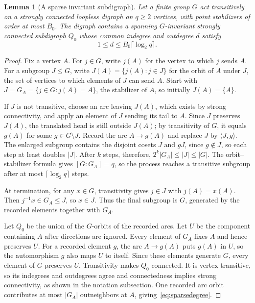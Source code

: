 \documentclass[11pt,a4paper,reqno]{amsart}
\newtheorem{lemma}[theorem]{Lemma}
\theoremstyle{definition}
\theoremstyle{remark}
\numberwithin{equation}{section}
\newcommand{\gen}[1]{\langle #1\rangle}
\begin{document}
\begin{lemma}[A sparse invariant subdigraph]\label{lem:sparse-quotient}
Let a finite group $G$ act transitively on a strongly connected loopless digraph on $q\ge2$ vertices, with point stabilizers of order at most $B_0$. The digraph contains a spanning $G$-invariant strongly connected subdigraph $Q_0$ whose common indegree and outdegree $d$ satisfy
\begin{equation}\label{eq:sparsedegree}
 1\le d\le B_0\lceil\log_2q\rceil.
\end{equation}
\end{lemma}
\begin{proof}
Fix a vertex $A$. For $j\in G$, write $j(A)$ for the vertex to which $j$ sends $A$. For a subgroup $J\le G$, write $J(A)=\{j(A):j\in J\}$ for the orbit of $A$ under $J$, the set of vertices to which elements of $J$ can send $A$. Start with $J=G_A=\{j\in G:j(A)=A\}$, the stabilizer of $A$, so initially $J(A)=\{A\}$.

If $J$ is not transitive, choose an arc leaving $J(A)$, which exists by strong connectivity, and apply an element of $J$ sending its tail to $A$. Since $J$ preserves $J(A)$, the translated head is still outside $J(A)$; by transitivity of $G$, it equals $g(A)$ for some $g\in G\setminus J$. Record the arc $A\to g(A)$ and replace $J$ by $\gen{J,g}$. The enlarged subgroup contains the disjoint cosets $J$ and $gJ$, since $g\notin J$, so each step at least doubles $|J|$. After $k$ steps, therefore, $2^k|G_A|\le |J|\le |G|$. The orbit--stabilizer formula gives $[G:G_A]=q$, so the process reaches a transitive subgroup after at most $\lceil\log_2q\rceil$ steps.

At termination, for any $x\in G$, transitivity gives $j\in J$ with $j(A)=x(A)$. Then $j^{-1}x\in G_A\le J$, so $x\in J$. Thus the final subgroup is $G$, generated by the recorded elements together with $G_A$.

Let $Q_0$ be the union of the $G$-orbits of the recorded arcs. Let $U$ be the component containing $A$ after directions are ignored. Every element of $G_A$ fixes $A$ and hence preserves $U$. For a recorded element $g$, the arc $A\to g(A)$ puts $g(A)$ in $U$, so the automorphism $g$ also maps $U$ to itself. Since these elements generate $G$, every element of $G$ preserves $U$. Transitivity makes $Q_0$ connected. It is vertex-transitive, so its indegrees and outdegrees agree and connectedness implies strong connectivity, as shown in the notation subsection. One recorded arc orbit contributes at most $|G_A|$ outneighbors at $A$, giving~\eqref{eq:sparsedegree}.
\end{proof}
\end{document}
